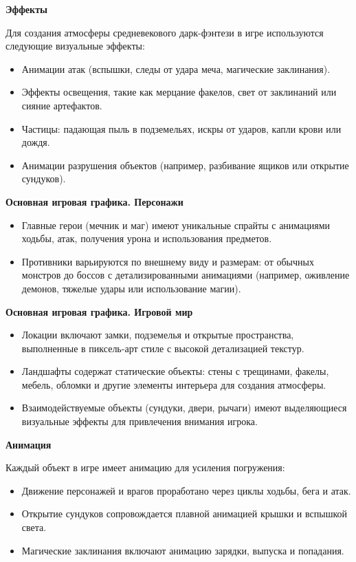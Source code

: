 \documentclass{article}
\begin{document}
\textbf{Эффекты}

Для создания атмосферы средневекового дарк-фэнтези в игре используются следующие визуальные эффекты:
\begin{itemize}
    \item Анимации атак (вспышки, следы от удара меча, магические заклинания).
    \item Эффекты освещения, такие как мерцание факелов, свет от заклинаний или сияние артефактов.
    \item Частицы: падающая пыль в подземельях, искры от ударов, капли крови или дождя.
    \item Анимации разрушения объектов (например, разбивание ящиков или открытие сундуков).
\end{itemize}

\textbf{Основная игровая графика. Персонажи}

\begin{itemize}
    \item Главные герои (мечник и маг) имеют уникальные спрайты с анимациями ходьбы, атак, получения урона и использования предметов.
    \item Противники варьируются по внешнему виду и размерам: от обычных монстров до боссов с детализированными анимациями (например, оживление демонов, тяжелые удары или использование магии).
\end{itemize}

\textbf{Основная игровая графика. Игровой мир}

\begin{itemize}
    \item Локации включают замки, подземелья и открытые пространства, выполненные в пиксель-арт стиле с высокой детализацией текстур.
    \item Ландшафты содержат статические объекты: стены с трещинами, факелы, мебель, обломки и другие элементы интерьера для создания атмосферы.
    \item Взаимодействуемые объекты (сундуки, двери, рычаги) имеют выделяющиеся визуальные эффекты для привлечения внимания игрока.
\end{itemize}

\textbf{Анимация}

Каждый объект в игре имеет анимацию для усиления погружения:
\begin{itemize}
    \item Движение персонажей и врагов проработано через циклы ходьбы, бега и атак.
    \item Открытие сундуков сопровождается плавной анимацией крышки и вспышкой света.
    \item Магические заклинания включают анимацию зарядки, выпуска и попадания.
\end{itemize}
\end{document}
